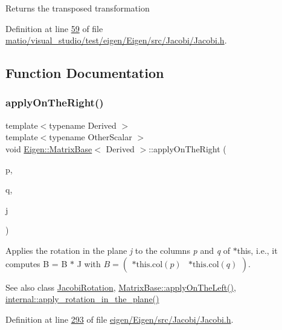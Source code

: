 Returns the transposed transformation 

Definition at line \hyperlink{matio_2visual__studio_2test_2eigen_2_eigen_2src_2_jacobi_2_jacobi_8h_source_l00059}{59} of file \hyperlink{matio_2visual__studio_2test_2eigen_2_eigen_2src_2_jacobi_2_jacobi_8h_source}{matio/visual\+\_\+studio/test/eigen/\+Eigen/src/\+Jacobi/\+Jacobi.\+h}.



\subsection{Function Documentation}
\mbox{\label{group___jacobi___module_gaa07f741c86219601664433777827bf1c}} 
\subsubsection{\texorpdfstring{apply\+On\+The\+Right()}{applyOnTheRight()}}
{\footnotesize\ttfamily template$<$typename Derived $>$ \\
template$<$typename Other\+Scalar $>$ \\
void \hyperlink{group___core___module_class_eigen_1_1_matrix_base}{Eigen\+::\+Matrix\+Base}$<$ Derived $>$\+::apply\+On\+The\+Right (\begin{DoxyParamCaption}\item[{\hyperlink{namespace_eigen_a62e77e0933482dafde8fe197d9a2cfde}{Index}}]{p,  }\item[{\hyperlink{namespace_eigen_a62e77e0933482dafde8fe197d9a2cfde}{Index}}]{q,  }\item[{const \hyperlink{group___jacobi___module_class_eigen_1_1_jacobi_rotation}{Jacobi\+Rotation}$<$ Other\+Scalar $>$ \&}]{j }\end{DoxyParamCaption})\hspace{0.3cm}{\ttfamily [inline]}}

Applies the rotation in the plane {\itshape j} to the columns {\itshape p} and {\itshape q} of {\ttfamily $\ast$this}, i.\+e., it computes B = B $\ast$ J with $ B = \left ( \begin{array}{cc} \text{*this.col}(p) & \text{*this.col}(q) \end{array} \right ) $.

\begin{DoxySeeAlso}{See also}
class \hyperlink{group___jacobi___module_class_eigen_1_1_jacobi_rotation}{Jacobi\+Rotation}, \hyperlink{group___core___module_a3a08ad41e81d8ad4a37b5d5c7490e765}{Matrix\+Base\+::apply\+On\+The\+Left()}, \hyperlink{namespace_eigen_1_1internal_a5f7738a5c56c9b9decf94d9728ba7906}{internal\+::apply\+\_\+rotation\+\_\+in\+\_\+the\+\_\+plane()} 
\end{DoxySeeAlso}


Definition at line \hyperlink{eigen_2_eigen_2src_2_jacobi_2_jacobi_8h_source_l00293}{293} of file \hyperlink{eigen_2_eigen_2src_2_jacobi_2_jacobi_8h_source}{eigen/\+Eigen/src/\+Jacobi/\+Jacobi.\+h}.

